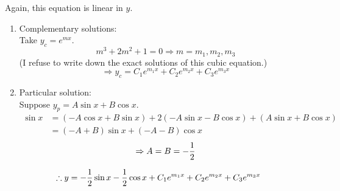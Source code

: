 \item

Again, this equation is linear in $y$.
\begin{enumerate}[wide, labelindent = 0pt, label = (\roman*)]
	\item Complementary solutions:\\
	Take $y_c = e^{mx}$.
	\[
		m^3 + 2m^2 + 1 = 0
		\Rightarrow m = m_1, m_2, m_3
	\]
	(I refuse to write down the exact solutions of this cubic equation.)
	\[
		\Rightarrow y_c = C_1 e^{m_1 x} + C_2 e^{m_2 x} + C_3 e^{m_3 x}
	\]

	\item Particular solution:\\
	Suppose $y_p = A\sin x + B\cos x$.
	\begin{align*}
		\sin x
		&= (-A\cos x + B\sin x) + 2(-A\sin x - B\cos x) + (A\sin x + B\cos x) \\
		&= (-A + B)\sin x + (-A - B)\cos x
	\end{align*}
	\[
		\Rightarrow A = B = -\frac{1}{2}
	\]
\end{enumerate}
\[
	\therefore y = -\frac{1}{2}\sin x -\frac{1}{2}\cos x + C_1 e^{m_1 x} + C_2 e^{m_2 x} + C_3 e^{m_3 x}
\]